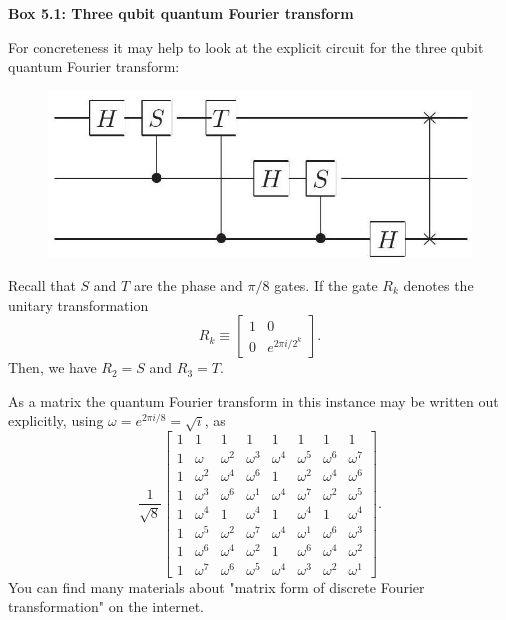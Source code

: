\textbf{Box 5.1: Three qubit quantum Fourier transform}

For concreteness it may help to look at the explicit circuit for the three qubit quantum Fourier transform: 
\begin{figure}     
\centering
\includegraphics[width=0.75\linewidth]{Images/2024_05_17_6977ce60de6fd27aef98g-254}
\end{figure}
Recall that $S$ and $T$ are the phase and $\pi / 8$ gates. If the gate $R_{k}$ denotes the unitary transformation
\begin{equation}
    R_{k} \equiv\left[\begin{array}{cc}
1 & 0  \tag{5.11}\\
0 & e^{2 \pi i / 2^{k}}
\end{array}\right].
\end{equation}
Then, we have $R_2=S$ and $R_3=T.$

As a matrix the quantum Fourier transform in this instance may be written out explicitly, using $\omega=e^{2 \pi i / 8}=\sqrt{i}$, as
\begin{equation}
    \frac{1}{\sqrt{8}}\left[\begin{array}{cccccccc}
1 & 1 & 1 & 1 & 1 & 1 & 1 & 1  \tag{5.19}\\
1 & \omega & \omega^{2} & \omega^{3} & \omega^{4} & \omega^{5} & \omega^{6} & \omega^{7} \\
1 & \omega^{2} & \omega^{4} & \omega^{6} & 1 & \omega^{2} & \omega^{4} & \omega^{6} \\
1 & \omega^{3} & \omega^{6} & \omega^{1} & \omega^{4} & \omega^{7} & \omega^{2} & \omega^{5} \\
1 & \omega^{4} & 1 & \omega^{4} & 1 & \omega^{4} & 1 & \omega^{4} \\
1 & \omega^{5} & \omega^{2} & \omega^{7} & \omega^{4} & \omega^{1} & \omega^{6} & \omega^{3} \\
1 & \omega^{6} & \omega^{4} & \omega^{2} & 1 & \omega^{6} & \omega^{4} & \omega^{2} \\
1 & \omega^{7} & \omega^{6} & \omega^{5} & \omega^{4} & \omega^{3} & \omega^{2} & \omega^{1}
\end{array}\right] .
\end{equation}
You can find many materials about "matrix form of discrete Fourier transformation" on the internet.


